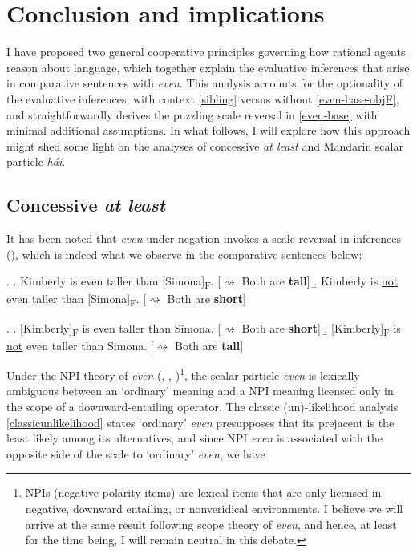 \documentclass[12pt,letterpaper]{scrartcl}
\newcommand{\alignright}{\hspace*{\fill}}
\newcommand{\infer}{$\rightsquigarrow$ }
\newcommand{\sub}[1]{\textsubscript{#1}}
\begin{document}
\section{Conclusion and implications}

I have proposed two general cooperative principles governing how rational agents reason about language, which together explain the evaluative inferences that arise in comparative sentences with \textit{even}. This analysis accounts for the optionality of the evaluative inferences, with context \ref{sibling} versus without \ref{even-base-objF}, and straightforwardly derives the puzzling scale reversal in \ref{even-base} with minimal additional assumptions. In what follows, I will explore how this approach might shed some light on the analyses of concessive \textit{at least} and Mandarin scalar particle \textit{h\'{a}i}.

\subsection{Concessive \textit{at least}} 

It has been noted that \textit{even} under negation invokes a scale reversal in inferences (\cite{karttunen_conventional_1979}), which is indeed what we observe in the comparative sentences below:

\ex. \a. Kimberly is even taller than [Simona]\sub{F}. \alignright [\infer Both are \textbf{tall}] 
\b. Kimberly is \underline{not} even taller than [Simona]\sub{F}. \alignright [\infer Both are \textbf{short}] \label{not-even-objF}

\ex. \a. [Kimberly]\sub{F} is even taller than Simona. \alignright [\infer Both are \textbf{short}] 
\b. [Kimberly]\sub{F} is \underline{not} even taller than Simona. \alignright [\infer Both are \textbf{tall}] \label{not-even-subF}

Under the NPI theory of \textit{even} (\cite{rooth_association_1985}, \cite{rullmann_even_1997}, \cite{giannakidou_landscape_2007})\footnote{NPIs (negative polarity items) are lexical items that are only licensed in negative, downward entailing, or nonveridical environments. I believe we will arrive at the same result following scope theory of \textit{even}, and hence, at least for the time being, I will remain neutral in this debate.}, the scalar particle \textit{even} is lexically ambiguous between an `ordinary' meaning and a NPI meaning licensed only in the scope of a downward-entailing operator. The classic (un)-likelihood analysis \ref{classicunlikelihood} states `ordinary' \textit{even} presupposes that its prejacent is the least likely among its alternatives, and since NPI \textit{even} is associated with the opposite side of the scale to `ordinary' \textit{even}, we have
\end{document}
